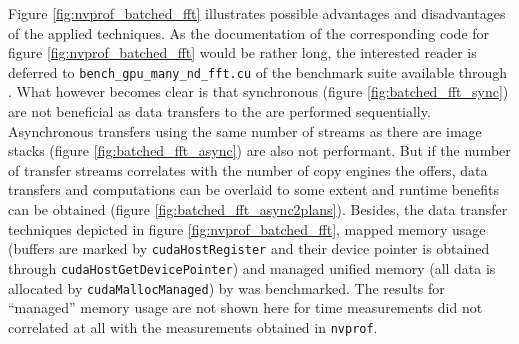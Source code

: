 Figure \ref{fig:nvprof_batched_fft} illustrates possible advantages and disadvantages of the applied techniques. As the documentation of the corresponding code for figure \ref{fig:nvprof_batched_fft} would be rather long, the interested reader is deferred to \texttt{bench\_gpu\_many\_nd\_fft.cu} of the \lmvn{} benchmark suite available through \cite{lmvn_repo}. What however becomes clear is that synchronous (figure \ref{fig:batched_fft_sync}) are not beneficial as data transfers to the \gpu{} are performed sequentially. Asynchronous transfers using the same number of streams as there are image stacks (figure \ref{fig:batched_fft_async}) are also not performant. But if the number of transfer streams correlates with the number of copy engines the \gpu{} offers, data transfers and computations can be overlaid to some extent and runtime benefits can be obtained (figure \ref{fig:batched_fft_async2plans}). Besides, the data transfer techniques depicted in figure \ref{fig:nvprof_batched_fft}, mapped memory usage (buffers are marked by \texttt{cudaHostRegister} and their device pointer is obtained through \texttt{cudaHostGetDevicePointer}) and managed unified memory (all data is allocated by \texttt{cudaMallocManaged}) by \cufft{}  was benchmarked. The results for ``managed'' memory usage are not shown here for time measurements did not correlated at all with the measurements obtained in \texttt{nvprof}. 

